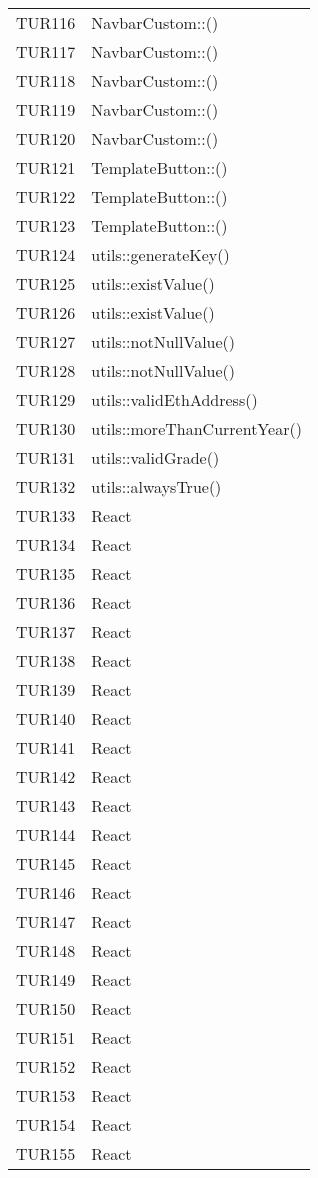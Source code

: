 \documentclass[PianoDiQualifica.tex]{subfiles}
\begin{document}
\begin{longtable}[H]{P{5cm}P{9cm}}
	TUR116 & NavbarCustom::() \\ 
	TUR117 & NavbarCustom::() \\ 
	TUR118 & NavbarCustom::() \\ 
	TUR119 & NavbarCustom::() \\ 
	TUR120 & NavbarCustom::() \\ 
	TUR121 & TemplateButton::() \\ 
	TUR122 & TemplateButton::() \\ 
	TUR123 & TemplateButton::() \\ 
	TUR124 & utils::generateKey() \\ 
	TUR125 & utils::existValue() \\ 
	TUR126 & utils::existValue() \\ 
	TUR127 & utils::notNullValue() \\ 
	TUR128 & utils::notNullValue() \\ 
	TUR129 & utils::validEthAddress() \\ 
	TUR130 & utils::moreThanCurrentYear() \\ 
	TUR131 & utils::validGrade() \\ 
	TUR132 & utils::alwaysTrue() \\ 
	TUR133 & React \\ 
	TUR134 & React \\ 
	TUR135 & React \\ 
	TUR136 & React \\ 
	TUR137 & React \\ 
	TUR138 & React \\ 
	TUR139 & React \\ 
	TUR140 & React \\ 
	TUR141 & React \\ 
	TUR142 & React \\ 
	TUR143 & React \\ 
	TUR144 & React \\ 
	TUR145 & React \\ 
	TUR146 & React \\ 
	TUR147 & React \\ 
	TUR148 & React \\ 
	TUR149 & React \\ 
	TUR150 & React \\ 
	TUR151 & React \\ 
	TUR152 & React \\ 
	TUR153 & React \\ 
	TUR154 & React \\ 
	TUR155 & React \\ 

\end{longtable}
\end{document}
